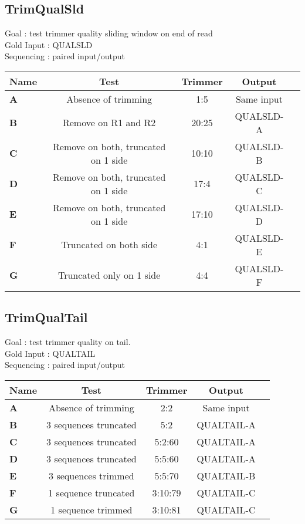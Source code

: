 \documentclass{article}
\begin{document}
\subsection{TrimQualSld}
Goal : test trimmer quality sliding window on end of read\\
Gold Input : QUALSLD\\
Sequencing : paired input/output
\begin{table}[H]
\begin{tabular}{|l|c|c|c|c|} \hline
    \textbf{Name} & \textbf{Test} & \textbf{Trimmer} & \textbf{Output} \\ \hline
    \textbf{A} & Absence of trimming & 1:5 & Same input \\ \hline
    \textbf{B} & Remove on R1 and R2 & 20:25 & QUALSLD-A\\ \hline
    \textbf{C} & Remove on both, truncated on 1 side & 10:10 & QUALSLD-B\\ \hline
    \textbf{D} & Remove on both, truncated on 1 side & 17:4 & QUALSLD-C\\ \hline
    \textbf{E} & Remove on both, truncated on 1 side & 17:10 & QUALSLD-D\\ \hline
    \textbf{F} & Truncated on both side & 4:1 & QUALSLD-E\\ \hline
    \textbf{G} & Truncated only on 1 side & 4:4 & QUALSLD-F\\ \hline
\end{tabular}
\end{table}

\subsection{TrimQualTail}
Goal : test trimmer quality on tail.\\
Gold Input : QUALTAIL\\
Sequencing : paired input/output
\begin{table}[H]
\begin{tabular}{|l|c|c|c|c|} \hline
    \textbf{Name} & \textbf{Test} & \textbf{Trimmer} & \textbf{Output} \\ \hline
    \textbf{A} & Absence of trimming & 2:2 & Same input \\ \hline
    \textbf{B} & 3 sequences truncated & 5:2 & QUALTAIL-A\\ \hline
    \textbf{C} & 3 sequences truncated & 5:2:60 & QUALTAIL-A\\ \hline
    \textbf{D} & 3 sequences truncated & 5:5:60 & QUALTAIL-A\\ \hline
    \textbf{E} & 3 sequences trimmed & 5:5:70 & QUALTAIL-B\\ \hline
    \textbf{F} & 1 sequence truncated & 3:10:79 & QUALTAIL-C\\ \hline
    \textbf{G} & 1 sequence trimmed & 3:10:81 & QUALTAIL-C\\ \hline
\end{tabular}
\end{table}
\end{document}
